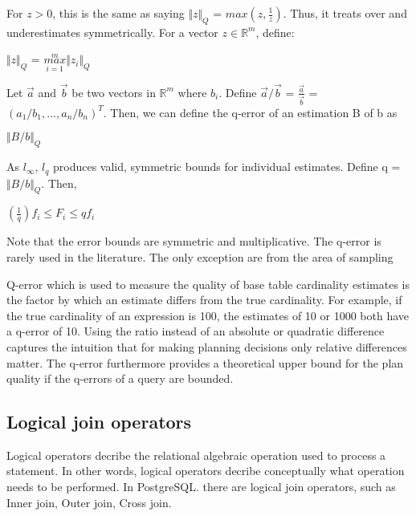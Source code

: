 {\justify
For $z>0$, this is the same as saying $\Vert{z}\Vert_{Q}$ = $max\left(z,{\frac{1}{z}}\right)$. Thus, it treats over and underestimates symmetrically. For a vector ${z}\in{{\mathbb{R}^{m}}}$, define:
\par }
{\justify
\centering ${\Vert{z}\Vert}_{Q}$ =  $\overset{m}{\underset{i=1}{max}}{\Vert{z_{i}}\Vert}_{Q}$
\par}
{\justify
Let $\vec{a}$ and $\vec{b}$ be two vectors in $\mathbb{R}^{m}$ where $b_{i}$. Define $\vec{a}{/}\vec{b}$ = $\frac{\vec{a}}{\vec{b}}$ = $\left({a_1/b_1},...,{a_n/b_n}\right)^{T}$. Then, we can define the q-error of an estimation B of b as
\par}
{\justify
\centering $\Vert{B/b}\Vert_{Q}$
\par}
{\justify
As $l_{\infty}$, $l_q$ produces valid, symmetric bounds for individual estimates. Define q = $\Vert{B/b}\Vert_{Q}$. Then,
\par}
{\justify
\centering ${\left(\frac{1}{q}\right)f_{i}}\le{F_{i}}\le{q{f_{i}}}$ 
\par}
{\justify
Note that the error bounds are symmetric and multiplicative. The q-error is rarely used in the literature. The only exception are from the area of sampling
\par}
\vspace{0.5cm}
{\justify
\justify
Q-error which is used to measure the quality of base table cardinality estimates is the factor by which an estimate differs from the true cardinality. For example, if the true cardinality of an expression is 100, the estimates of 10 or 1000 both have a q-error of 10. Using the ratio instead of an absolute or quadratic difference captures the intuition that for making planning decisions only relative differences matter. The q-error furthermore provides a theoretical upper bound for the plan quality if the q-errors of a query are bounded.
\par}
\vspace{0.5cm}
\subsection{Logical join operators}
{\justify
Logical operators \cite{join operators} decribe the relational algebraic operation used to process a statement. In other words, logical operators decribe conceptually what operation needs to be performed. In PostgreSQL. there are logical join operators, such as Inner join, Outer join, Cross join.
\par }
\vspace{0.5cm}
